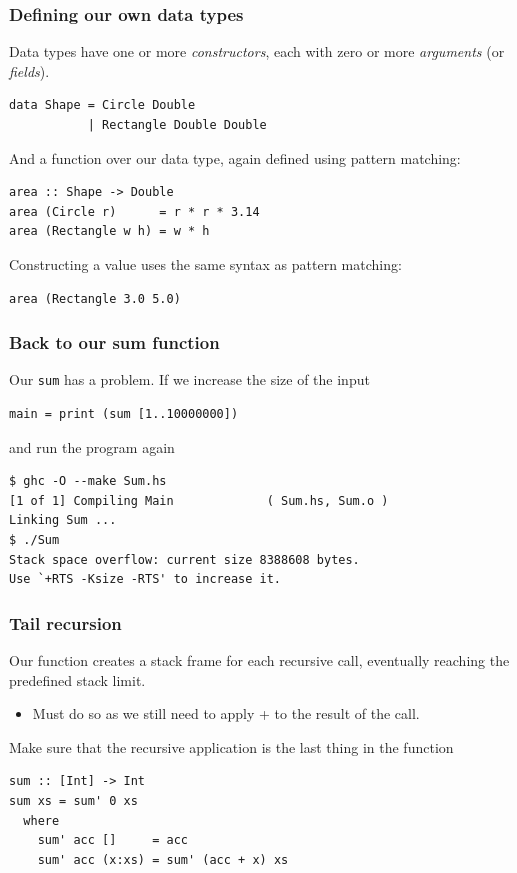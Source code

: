 \documentclass{beamer}
\begin{document}
\begin{frame}[fragile]
  \frametitle{Defining our own data types}

  Data types have one or more \emph{constructors}, each with zero or
  more \emph{arguments} (or \emph{fields}).

  \begin{lstlisting}
data Shape = Circle Double
           | Rectangle Double Double
  \end{lstlisting}

  And a function over our data type, again defined using pattern
  matching:
  \begin{lstlisting}
area :: Shape -> Double
area (Circle r)      = r * r * 3.14
area (Rectangle w h) = w * h
  \end{lstlisting}

  Constructing a value uses the same syntax as pattern matching:
\begin{lstlisting}
area (Rectangle 3.0 5.0)
\end{lstlisting}
\end{frame}

\begin{frame}[fragile]
  \frametitle{Back to our sum function}

  Our \lstinline!sum! has a problem. If we increase the size of the
  input

\begin{lstlisting}
main = print (sum [1..10000000])
\end{lstlisting}

and run the program again

\begin{verbatim}
$ ghc -O --make Sum.hs
[1 of 1] Compiling Main             ( Sum.hs, Sum.o )
Linking Sum ...
$ ./Sum
Stack space overflow: current size 8388608 bytes.
Use `+RTS -Ksize -RTS' to increase it.
\end{verbatim}
\end{frame}

\begin{frame}[fragile]
  \frametitle{Tail recursion}

  Our function creates a stack frame for each recursive call,
  eventually reaching the predefined stack limit.
  \begin{itemize}
  \item Must do so as we still need to apply + to the result of the
    call.
  \end{itemize}

  Make sure that the recursive application is the last thing in the
  function
  \begin{lstlisting}
sum :: [Int] -> Int
sum xs = sum' 0 xs
  where
    sum' acc []     = acc
    sum' acc (x:xs) = sum' (acc + x) xs
  \end{lstlisting}
\end{frame}
\end{document}
